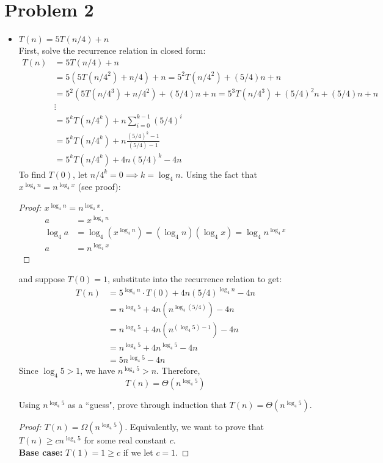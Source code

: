 \documentclass{article}
\begin{document}
\section*{Problem 2}
	\begin{itemize}
	\item $T(n)=5T(n/4)+n$ \\
	First, solve the recurrence relation in closed form:
	\begin{align*}
	T(n)&=5T(n/4)+n \\
	&=5(5T(n/4^2)+n/4) + n = 5^2 T(n/4^2) + (5/4)n + n \\
	&=5^2(5T(n/4^3)+n/4^2) + (5/4)n + n = 5^3 T(n/4^3) + (5/4)^2 n + (5/4)n + n\\
	& \vdots \\
	&=5^k T(n/4^k) + n\sum_{i=0}^{k-1}(5/4)^i \\
	&=5^kT(n/4^k) + n \frac{(5/4)^k-1}{(5/4)-1} \\
	&=5^kT(n/4^k) + 4n(5/4)^k - 4n
	\end{align*}
	To find $T(0)$, let $n/4^k = 0 \implies k = \log_4 n$. Using the fact that $x^{\log_4 n} = n^{\log_4 x}$ (see proof):
	\begin{mdframed}
	\begin{proof}[Proof: $x^{\log_4 n} = n^{\log_4 x}$]
	\begin{align*}
	a &= x^{\log_4 n} \\
	\log_4 a &= \log_4 (x^{\log_4 n}) = (\log_4 n) (\log_4 x) = \log_4 n^{\log_4 x}\\
	a &= n^{\log_4 x}
	\end{align*}
	\end{proof}
	\end{mdframed}
	and suppose $T(0)=1$, substitute into the recurrence relation to get:
	\begin{align*}
	T(n) &= 5^{\log_4 n}\cdot T(0) + 4n(5/4)^{\log_4 n} - 4n\\
	&=n^{\log_4 5} + 4n(n^{\log_4 (5/4)}) -4n \\
	&=n^{\log_4 5} + 4n(n^{(\log_4 5) - 1})-4n\\
	&=n^{\log_4 5} + 4n^{\log_4 5} -4n\\
	&=5n^{\log_4 5} - 4n
	\end{align*}
	Since $\log_4 5 > 1$, we have $n^{\log_4 5} > n$. Therefore, $$T(n) = \Theta(n^{\log_4 5})$$
	
	Using $n^{\log_4 5}$ as a ``guess", prove through induction that $T(n) = \Theta(n^{\log_4 5})$.
	\begin{mdframed}
	\begin{proof}[Proof: $T(n) = \Omega(n^{\log_4 5})$]
	Equivalently, we want to prove that $T(n) \geq cn^{\log_4 5}$ for some real constant $c$. \\
	{\bf Base case:} $T(1) = 1 \geq c$ if we let $c = 1$.
	

\end{proof}
\end{mdframed}
\end{itemize}
\end{document}

